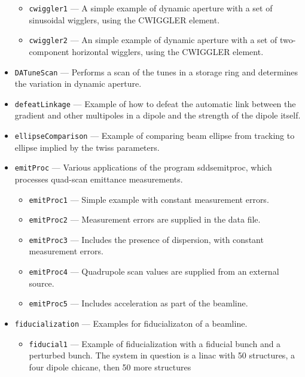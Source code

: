 \begin{itemize}
\begin{itemize}
\item \verb|cwiggler1| --- 
 A simple example of dynamic aperture with a set of sinusoidal wigglers, using the CWIGGLER element. 

\item \verb|cwiggler2| --- 
 An simple example of dynamic aperture with a set of two-component horizontal wigglers, using the CWIGGLER element. 

\end{itemize}
\item \verb|DATuneScan| --- 
 Performs a scan of the tunes in a storage ring and determines the variation in dynamic aperture. 

\item \verb|defeatLinkage| --- 
 Example of how to defeat the automatic link between the gradient and other multipoles in a dipole and the strength of the dipole itself. 

\item \verb|ellipseComparison| --- 
 Example of comparing beam ellipse from tracking to ellipse implied by the twiss parameters. 

\item \verb|emitProc| --- 
 Various applications of the program sddsemitproc, which processes quad-scan emittance measurements. 

\begin{itemize}
\item \verb|emitProc1| --- 
 Simple example with constant measurement errors. 

\item \verb|emitProc2| --- 
 Measurement errors are supplied in the data file. 

\item \verb|emitProc3| --- 
 Includes the presence of dispersion, with constant measurement errors. 

\item \verb|emitProc4| --- 
 Quadrupole scan values are supplied from an external source. 

\item \verb|emitProc5| --- 
 Includes acceleration as part of the beamline. 

\end{itemize}
\item \verb|fiducialization| --- 
 Examples for fiducializaton of a beamline. 

\begin{itemize}
\item \verb|fiducial1| --- 
 Example of fiducialization with a fiducial bunch and a perturbed bunch.  The system in question is a linac with 50 structures, a four dipole chicane, then 50 more structures 


\end{itemize}
\end{itemize}
